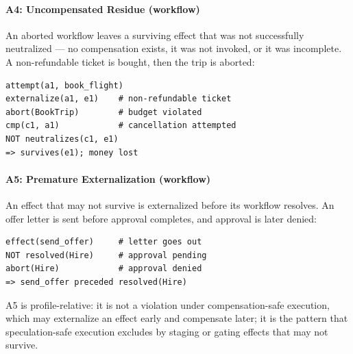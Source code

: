 \documentclass[runningheads]{comsis3}
\begin{document}
\paragraph{A4: Uncompensated Residue (workflow)}
An aborted workflow leaves a surviving effect that was not
successfully neutralized --- no compensation exists, it was not invoked,
or it was incomplete. A non-refundable ticket is bought, then the trip is
aborted:
\par\medskip\noindent\begin{minipage}{\linewidth}
\begingroup\small\begin{verbatim}
attempt(a1, book_flight)
externalize(a1, e1)    # non-refundable ticket
abort(BookTrip)        # budget violated
cmp(c1, a1)            # cancellation attempted
NOT neutralizes(c1, e1)
=> survives(e1); money lost
\end{verbatim}\endgroup
\end{minipage}\par\medskip

\paragraph{A5: Premature Externalization (workflow)}
An effect that may not survive is externalized before its workflow
resolves. An offer letter is sent before approval completes, and approval
is later denied:
\par\medskip\noindent\begin{minipage}{\linewidth}
\begingroup\small\begin{verbatim}
effect(send_offer)     # letter goes out
NOT resolved(Hire)     # approval pending
abort(Hire)            # approval denied
=> send_offer preceded resolved(Hire)
\end{verbatim}\endgroup
\end{minipage}\par\medskip\noindent
A5 is profile-relative: it is not a violation under compensation-safe
execution, which may externalize an effect early and compensate later; it
is the pattern that speculation-safe execution excludes by staging or
gating effects that may not survive.
\end{document}
